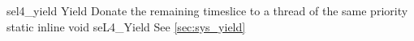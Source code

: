 %
%
%
%

\apidoc
{sel4_yield}
{Yield}
{Donate the remaining timeslice to a thread of the same priority}
{static inline void seL4\_Yield}
{
}
{\noret}
{See \autoref{sec:sys_yield}}
